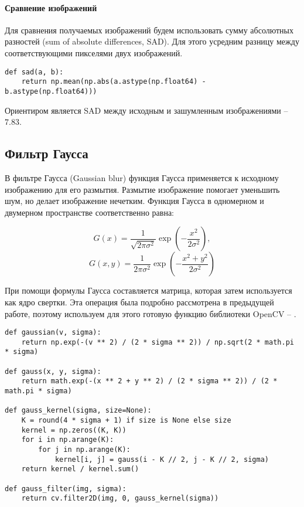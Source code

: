 \paragraph{Сравнение изображений}

Для сравнения получаемых изображений будем использовать сумму абсолютных разностей (sum of absolute differences, SAD). Для этого усредним разницу между соответствующими пикселями двух изображений.

\begin{lstlisting}[caption={Фунукция для сравнения изображений}]
def sad(a, b):
	return np.mean(np.abs(a.astype(np.float64) - b.astype(np.float64)))
\end{lstlisting}

Ориентиром является SAD между исходным и зашумленным изображениями -- $7.83$.

\subsection{Фильтр Гаусса}

В фильтре Гаусса (Gaussian blur) функция Гаусса применяется к исходному изображению для его размытия. Размытие изображение помогает уменьшить шум, но делает изображение нечетким. Функция Гаусса в одномерном и двумерном пространстве соответственно равна:

$$
G(x) = \dfrac{1}{\sqrt{2 \pi \sigma^2}} \exp{\left( -\dfrac{x^2}{2 \sigma ^2} \right)},
$$
$$
G(x, y) = \dfrac{1}{2 \pi \sigma^2} \exp{\left( -\dfrac{x^2 + y^2}{2 \sigma ^2} \right)}
$$

При помощи формулы Гаусса составляется матрица, которая затем используется как ядро свертки. Эта операция была подробно рассмотрена в предыдущей работе, поэтому используем для этого готовую функцию библиотеки OpenCV -- .

\begin{lstlisting}[caption={Фунукция для применения фильтра Гаусса}]
def gaussian(v, sigma):
	return np.exp(-(v ** 2) / (2 * sigma ** 2)) / np.sqrt(2 * math.pi * sigma)
	
def gauss(x, y, sigma):
	return math.exp(-(x ** 2 + y ** 2) / (2 * sigma ** 2)) / (2 * math.pi * sigma)
	
def gauss_kernel(sigma, size=None):
	K = round(4 * sigma + 1) if size is None else size
	kernel = np.zeros((K, K))
	for i in np.arange(K):
		for j in np.arange(K):
			kernel[i, j] = gauss(i - K // 2, j - K // 2, sigma)
	return kernel / kernel.sum()
	
def gauss_filter(img, sigma):
	return cv.filter2D(img, 0, gauss_kernel(sigma))
\end{lstlisting}

